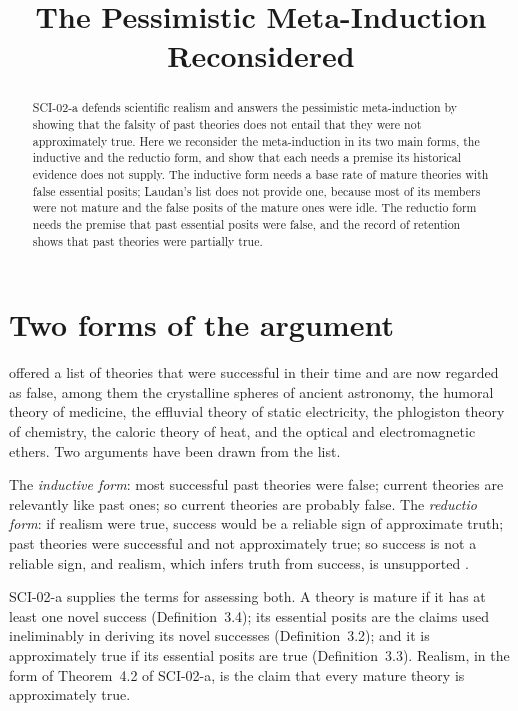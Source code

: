\documentclass{situationist-preprint}
\title{The Pessimistic Meta-Induction Reconsidered}
\begin{document}
\maketitle

\begin{abstract}
SCI-02-a defends scientific realism and answers the pessimistic meta-induction by showing that the falsity of past theories does not entail that they were not approximately true. Here we reconsider the meta-induction in its two main forms, the inductive and the reductio form, and show that each needs a premise its historical evidence does not supply. The inductive form needs a base rate of mature theories with false essential posits; Laudan's list does not provide one, because most of its members were not mature and the false posits of the mature ones were idle. The reductio form needs the premise that past essential posits were false, and the record of retention shows that past theories were partially true.
\end{abstract}

\section{Two forms of the argument}\label{s:forms}

\citet{Laudan1981} offered a list of theories that were successful in their time and are now regarded as false, among them the crystalline spheres of ancient astronomy, the humoral theory of medicine, the effluvial theory of static electricity, the phlogiston theory of chemistry, the caloric theory of heat, and the optical and electromagnetic ethers. Two arguments have been drawn from the list.

The \emph{inductive form}: most successful past theories were false; current theories are relevantly like past ones; so current theories are probably false. The \emph{reductio form}: if realism were true, success would be a reliable sign of approximate truth; past theories were successful and not approximately true; so success is not a reliable sign, and realism, which infers truth from success, is unsupported \citep{Lewis2001}.

SCI-02-a supplies the terms for assessing both. A theory is mature if it has at least one novel success (Definition~3.4); its essential posits are the claims used ineliminably in deriving its novel successes (Definition~3.2); and it is approximately true if its essential posits are true (Definition~3.3). Realism, in the form of Theorem~4.2 of SCI-02-a, is the claim that every mature theory is approximately true.
\end{document}
